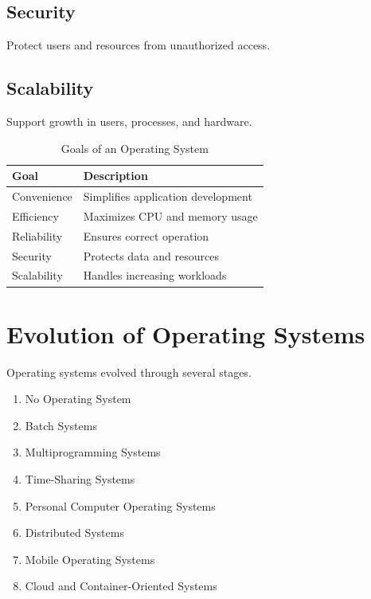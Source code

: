 \subsection{Security}

Protect users and resources from unauthorized access.

\subsection{Scalability}

Support growth in users, processes, and hardware.

\begin{table}[H]
\centering
\begin{tabular}{|p{4cm}|p{8cm}|}
\hline
Goal & Description \\
\hline
Convenience & Simplifies application development \\
\hline
Efficiency & Maximizes CPU and memory usage \\
\hline
Reliability & Ensures correct operation \\
\hline
Security & Protects data and resources \\
\hline
Scalability & Handles increasing workloads \\
\hline
\end{tabular}
\caption{Goals of an Operating System}
\end{table}

\section{Evolution of Operating Systems}

Operating systems evolved through several stages.

\begin{enumerate}
\item No Operating System
\item Batch Systems
\item Multiprogramming Systems
\item Time-Sharing Systems
\item Personal Computer Operating Systems
\item Distributed Systems
\item Mobile Operating Systems
\item Cloud and Container-Oriented Systems
\end{enumerate}

